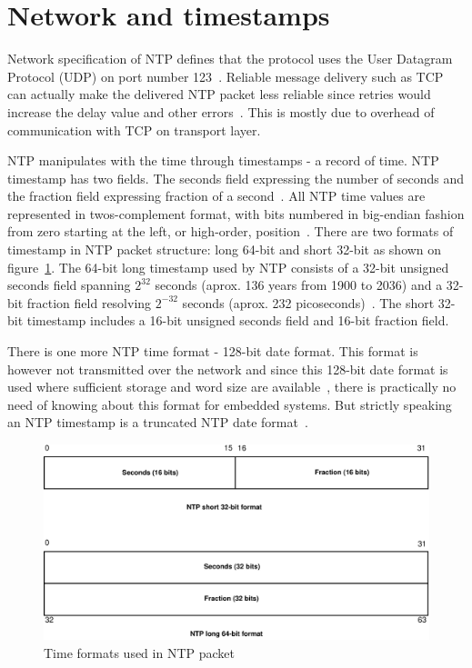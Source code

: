 
\section{Network and timestamps}\label{sec:ntp-network}
Network specification of NTP defines that
the protocol uses the User Datagram Protocol (UDP) on port number 123~\cite{ianna-ports,rfc5905}.
Reliable message delivery such as TCP can actually make the delivered NTP packet less reliable since retries
would increase the delay value and other errors~\cite{rfc5905}.
This is mostly due to overhead of communication with TCP on transport layer.

NTP manipulates with the time through timestamps - a record of time.
NTP timestamp has two fields. The seconds field expressing the number of seconds
and the fraction field expressing fraction of a second~\cite{rfc5905}.
All NTP time values are represented in twos-complement format, with
bits numbered in big-endian fashion from zero starting at the left, or high-order, position~\cite{rfc5905}. 
There are two formats of timestamp in NTP packet structure:
long 64-bit and short 32-bit as shown on figure~\ref{fig:ntp-timestamps}.
The 64-bit long timestamp used by NTP consists of a 32-bit unsigned seconds
field spanning $2^{32}$ seconds (aprox. 136 years from 1900 to 2036) and a 32-bit fraction field resolving
$2^{-32}$ seconds (aprox. 232 picoseconds)~\cite{rfc5905}.
The short 32-bit timestamp includes a 16-bit unsigned seconds field
and 16-bit fraction field.

There is one more NTP time format - 128-bit date format.
This format is however not transmitted over the network
and since this 128-bit date format is used where sufficient storage and word
size are available~\cite{rfc5905},
there is practically no need of knowing about this format for embedded systems.
But strictly speaking an NTP timestamp is a truncated NTP date format~\cite{rfc5905}.

\begin{figure}
	\centering
	\includegraphics[width=13cm,keepaspectratio]{fig/ntp-timestamps.pdf}
	\caption{Time formats used in NTP packet}
	\label{fig:ntp-timestamps}
	\bigskip
\end{figure}

